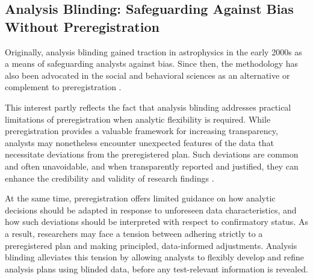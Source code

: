 \subsection{Analysis Blinding: Safeguarding Against Bias Without Preregistration}\label{analysis-blinding-safeguarding-against-bias-without-preregistration}

Originally, analysis blinding gained traction in astrophysics in the early 2000s \citep{maccoun2018psychological} as a means of safeguarding analysts against bias. Since then, the methodology has also been advocated in the social and behavioral sciences as an alternative or complement to preregistration \citep{dutilh2021blinding, nagy2025bestiary, maccoun2021removebiases, maccoun2015hide, maccoun2018psychological, aczel2020transparency}.

This interest partly reflects the fact that analysis blinding addresses practical limitations of preregistration when analytic flexibility is required. While preregistration provides a valuable framework for increasing transparency, analysts may nonetheless encounter unexpected features of the data that necessitate deviations from the preregistered plan. Such deviations are common and often unavoidable, and when transparently reported and justified, they can enhance the credibility and validity of research findings \citep[e.g.,][]{vandenakker2024potential, Lakens2024-tj, Schneider2022-oq, Song2022-em}.

At the same time, preregistration offers limited guidance on how analytic decisions should be adapted in response to unforeseen data characteristics, and how such deviations should be interpreted with respect to confirmatory status. As a result, researchers may face a tension between adhering strictly to a preregistered plan and making principled, data-informed adjustments. Analysis blinding alleviates this tension by allowing analysts to flexibly develop and refine analysis plans using blinded data, before any test-relevant information is revealed.

